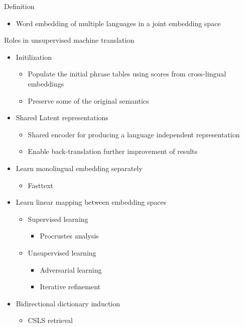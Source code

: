 \documentclass[11pt, a4paper, landscape]{article}
\begin{document}
	\vfill


	
	\NewPage
	\vfill

	Definition
	\begin{itemize}
		\item Word embedding of multiple languages in a joint embedding space		\\
	\end{itemize}
	Roles in unsupervised machine translation 
	\begin{itemize}
		\item Initilization
			\begin{itemize}
				\item Populate the initial phrase tables using scores from cross-lingual embeddings
				\item Preserve some of the original semantics
			\end{itemize}
		\item Shared Latent representations
			\begin{itemize}
				\item Shared encoder for producing a language independent representation
				\item Enable back-translation further improvement of results
			\end{itemize}
		
	\end{itemize}
	\vfill

	\NewPage
	\vfill
	\begin{itemize}
		\item Learn monolingual embedding separately
			\begin{itemize}
				\item Fasttext 
			\end{itemize}
		\item Learn linear mapping between embedding spaces	
			\begin{itemize}
				\item Supervised learning
					\begin{itemize}
						\item Procrustes analysis
					\end{itemize}
				\item Unsupervised learning
					\begin{itemize}
						\item Adversarial learning
						\item Iterative refinement
					\end{itemize}
			\end{itemize}
		\item Bidirectional dictionary induction
			\begin{itemize}
				\item CSLS retrieval 
			\end{itemize}
	\end{itemize}
	\vfill
	
\end{document}
